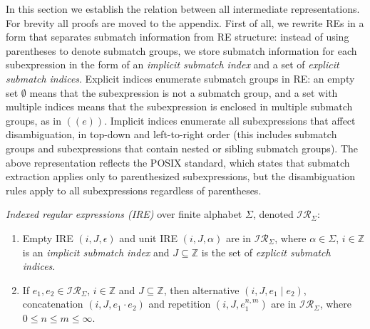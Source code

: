 \documentclass[AMA,STIX1COL]{WileyNJD-v2}
\newcommand{\XI}{\mathcal{I}}
\newcommand{\XIR}{\XI\!\XR}
\newcommand{\XR}{\mathcal{R}}
\newcommand{\YZ}{\mathbb{Z}}
\begin{document}
In this section we establish the relation between all intermediate representations.
For brevity all proofs are moved to the appendix.
%
First of all, we rewrite REs in a form that separates submatch information from RE structure:
instead of using parentheses to denote submatch groups,
we store submatch information for each subexpression in the form of an \emph{implicit submatch index} and a set of \emph{explicit submatch indices}.
Explicit indices enumerate submatch groups in RE:
an empty set $\emptyset$ means that the subexpression is not a submatch group,
and a set with multiple indices means that the subexpression is enclosed in multiple submatch groups, as in $((e))$.
Implicit indices enumerate all subexpressions that affect disambiguation, in top-down and left-to-right order
(this includes submatch groups and subexpressions that contain nested or sibling submatch groups).
The above representation reflects the POSIX standard, which states that
submatch extraction applies only to parenthesized subexpressions,
but the disambiguation rules apply to all subexpressions regardless of parentheses.

    \begin{definition}
    \emph{Indexed regular expressions (IRE)} over finite alphabet $\Sigma$, denoted $\XIR_\Sigma$:
    \begin{enumerate}
        \item
          Empty IRE $(i, J, \epsilon)$ and unit IRE $(i, J, \alpha)$ are in $\XIR_\Sigma$,
          where $\alpha \in \Sigma$,
          $i \in \YZ$ is an \emph{implicit submatch index}
          and $J \subseteq \YZ$ is the set of \emph{explicit submatch indices}.

        \item If $e_1, e_2 \in \XIR_\Sigma$, $i \in \YZ$ and $J \subseteq \YZ$, then
          alternative $(i, J, e_1 \mid e_2)$,
          concatenation $(i, J, e_1 \cdot e_2)$ and
          repetition $(i, J, e_1^{n, m})$ are in $\XIR_\Sigma$,
          where $0 \leq n \leq m \leq \infty$.
    \end{enumerate}
    \end{definition}
\end{document}
